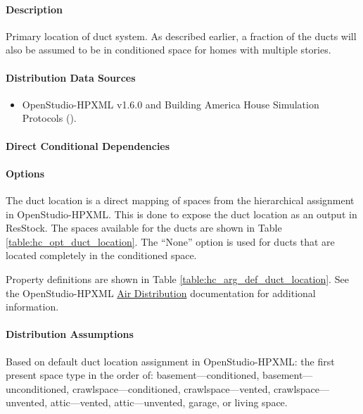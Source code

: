 \paragraph{Description}
% 
Primary location of duct system. As described earlier, a fraction of the ducts will also be assumed to be in conditioned space for homes with multiple stories.

\paragraph{Distribution Data Sources}
% 
\begin{itemize}
\item 

OpenStudio-HPXML v1.6.0 and Building America House Simulation Protocols (\cite{Wilson2014}). 
\end{itemize}

\paragraph{Direct Conditional Dependencies}


\paragraph{Options}
The duct location is a direct mapping of spaces from the hierarchical assignment in OpenStudio-HPXML. This is done to expose the duct location as an output in ResStock. The spaces available for the ducts are shown in Table \ref{table:hc_opt_duct_location}. The ``None'' option is used for ducts that are located completely in the conditioned space.



Property definitions are shown in Table \ref{table:hc_arg_def_duct_location}. See the OpenStudio-HPXML \href{https://openstudio-hpxml.readthedocs.io/en/v1.10.0/workflow_inputs.html#hpxml-air-distribtuion}{Air Distribution} documentation for additional information.



\paragraph{Distribution Assumptions}
% 
Based on default duct location assignment in OpenStudio-HPXML: the first present space type in the order of: basement---conditioned, basement---unconditioned, crawlspace---conditioned, crawlspace---vented, crawlspace---unvented, attic---vented, attic---unvented, garage, or living space. 
